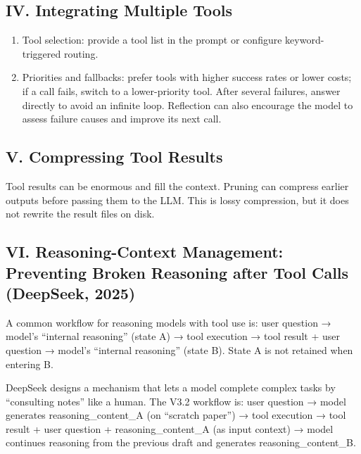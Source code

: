 \hypertarget{iv.-integrating-multiple-tools}{%
\subsection{IV. Integrating Multiple Tools}\label{iv.-integrating-multiple-tools}}

\begin{enumerate}
\def\labelenumi{\arabic{enumi}.}
\item
  Tool selection: provide a tool list in the prompt or configure keyword-triggered routing.
\item
  Priorities and fallbacks: prefer tools with higher success rates or lower costs; if a call fails, switch to a lower-priority tool. After several failures, answer directly to avoid an infinite loop. Reflection can also encourage the model to assess failure causes and improve its next call.
\end{enumerate}

\hypertarget{v.-compressing-tool-results}{%
\subsection{V. Compressing Tool Results}\label{v.-compressing-tool-results}}

Tool results can be enormous and fill the context. Pruning can compress earlier outputs before passing them to the LLM. This is lossy compression, but it does not rewrite the result files on disk.

\hypertarget{vi.-reasoning-context-management-preventing-broken-reasoning-after-tool-calls-deepseek-2025}{%
\subsection{VI. Reasoning-Context Management: Preventing Broken Reasoning after Tool Calls (DeepSeek, 2025)}\label{vi.-reasoning-context-management-preventing-broken-reasoning-after-tool-calls-deepseek-2025}}

A common workflow for reasoning models with tool use is: user question → model's ``internal reasoning'' (state A) → tool execution → tool result + user question → model's ``internal reasoning'' (state B). State A is not retained when entering B.

DeepSeek designs a mechanism that lets a model complete complex tasks by ``consulting notes'' like a human. The V3.2 workflow is: user question → model generates reasoning\_content\_A (on ``scratch paper'') → tool execution → tool result + user question + reasoning\_content\_A (as input context) → model continues reasoning from the previous draft and generates reasoning\_content\_B.

